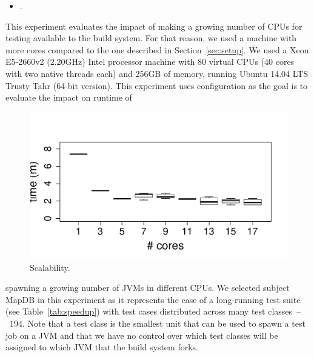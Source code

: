 
\begin{center}
\end{center}

\begin{itemize}
    \item \numRQSpeedupTwo{}. \textbf{\RQSpeedupTwo}
\end{itemize}

\newcommand{\subjectScalability}{MapDB}

This experiment evaluates the impact of making a growing number of
CPUs for testing available to the build system.  For that reason, we
used a machine with more cores compared to the one described in
Section~\ref{sec:setup}.  We used a Xeon E5-2660v2 (2.20GHz) Intel
processor machine with 80 virtual CPUs (40 cores with two native
threads each) and 256GB of memory, running Ubuntu 14.04 LTS Trusty
Tahr (64-bit version). This experiment uses configuration
\emph{\ForkSeq{}} as the goal is to evaluate the impact on runtime of
\begin{figure}%
  \centering
  \includegraphics[width=.25\textwidth]{R/scalability/scalability.pdf}
  \caption{\label{fig:scalability}Scalability.}
\end{figure}
spawning a growing number of JVMs in different CPUs.  We selected
subject \subjectScalability{} in this experiment as it represents the
case of a long-running test suite (see Table~\ref{tab:speedup}) with
test cases distributed across many test classes~--~194.  Note that a
test class is the smallest unit that can be used to spawn a test job
on a JVM and that we have no control over which test classes will be
assigned to which JVM that the build system forks.

